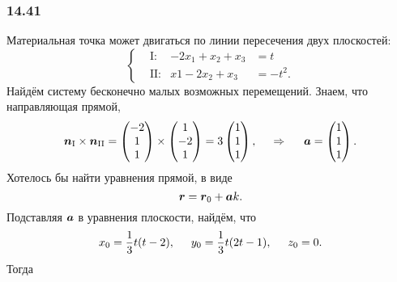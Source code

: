 \subsubsection*{14.41}

Материальная точка может двигаться по линии пересечения двух плоскостей:
\begin{equation*}
    \left\{\begin{aligned}
        &\text{I}: &-2x_1 + x_2 + x_3  &= t \\
        &\text{II}: &x1 - 2x_2 + x_3 &= -t^2.
    \end{aligned}\right.
\end{equation*}
Найдём систему бесконечно малых возможных перемещений.
Знаем, что направляющая прямой,
\begin{equation*}
    \mbox{\boldmath $n$}_\text{I} \times \mbox{\boldmath $n$}_\text{II} = 
    \begin{pmatrix}
        -2 \\ 1 \\ 1
    \end{pmatrix} \times
    \begin{pmatrix}
        1 \\ -2 \\ 1
    \end{pmatrix} = 3 \begin{pmatrix}
        1 \\ 1 \\ 1
    \end{pmatrix},
    \hspace{0.5cm} \Rightarrow \hspace{0.5cm} 
    \mbox{\boldmath $a$} = \begin{pmatrix}
        1 \\ 1 \\ 1
    \end{pmatrix}.
\end{equation*}
Хотелось бы найти уравнения прямой, в виде
\begin{equation*}
    \mbox{\boldmath $r$} = \mbox{\boldmath $r$}_0 + \mbox{\boldmath $a$} k.
\end{equation*}
Подставляя $\mbox{\boldmath $a$}$ в уравнения плоскости, найдём, что
\begin{equation*}
    x_0 = \frac{1}{3} t (t-2), \hspace{0.5cm} 
    y_0 = \frac{1}{3} t (2t - 1), \hspace{0.5cm} 
    z_0 = 0.
\end{equation*}
Тогда

